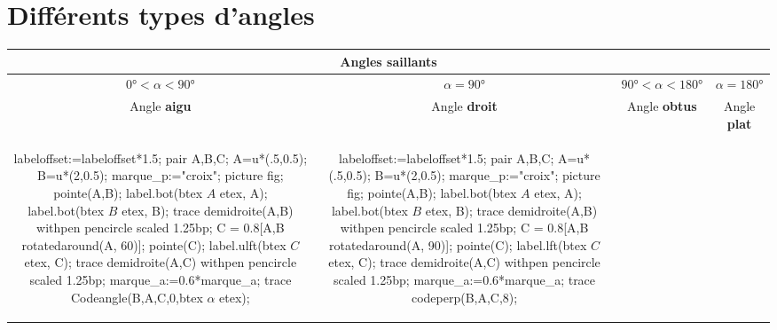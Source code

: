 \section{Différents types d'angles}

\begin{changemargin}{0mm}{-15mm}
\begin{definition}[Classement des angles selon leur mesure $\alpha=\widehat{BAC}$]
    {\renewcommand{\arraystretch}{1.5}
    \begin{tabular}{|*4{c|}}
        \hline
        \multicolumn{4}{|c|}{Angles {\bfseries saillants}}\\\hline
        $\ang{0}<\alpha<\ang{90}$ & $\alpha=\ang{90}$ & $\ang{90}<\alpha<\ang{180}$ & $\alpha=\ang{180}$ \\\hline
        Angle \textbf{aigu} & Angle \textbf{droit} &  Angle \textbf{obtus} & Angle \textbf{plat} \\\hline
        \begin{Geometrie}[CoinHD={(2.5u,2u)}]            
            labeloffset:=labeloffset*1.5;
            pair A,B,C;
            A=u*(.5,0.5);
            B=u*(2,0.5);
            marque_p:="croix";
            picture fig;
            pointe(A,B);
            label.bot(btex $A$ etex, A);
            label.bot(btex $B$ etex, B);
            trace demidroite(A,B) withpen pencircle scaled 1.25bp;
            C = 0.8[A,B rotatedaround(A, 60)];
            pointe(C);
            label.ulft(btex $C$ etex, C);
            trace demidroite(A,C) withpen pencircle scaled 1.25bp;
            marque_a:=0.6*marque_a;
            trace Codeangle(B,A,C,0,btex $\alpha$ etex);
        \end{Geometrie}
        &
        \begin{Geometrie}[CoinHD={(2.5u,2u)}]            
            labeloffset:=labeloffset*1.5;
            pair A,B,C;
            A=u*(.5,0.5);
            B=u*(2,0.5);
            marque_p:="croix";
            picture fig;
            pointe(A,B);
            label.bot(btex $A$ etex, A);
            label.bot(btex $B$ etex, B);
            trace demidroite(A,B) withpen pencircle scaled 1.25bp;
            C = 0.8[A,B rotatedaround(A, 90)];
            pointe(C);
            label.lft(btex $C$ etex, C);
            trace demidroite(A,C) withpen pencircle scaled 1.25bp;
            marque_a:=0.6*marque_a;
            trace codeperp(B,A,C,8);
        \end{Geometrie}
        &
        \begin{Geometrie}[CoinBG={(-u,0)},CoinHD={(2.5u,2u)}]            

\end{Geometrie}
\end{tabular}}
\end{definition}
\end{changemargin}
